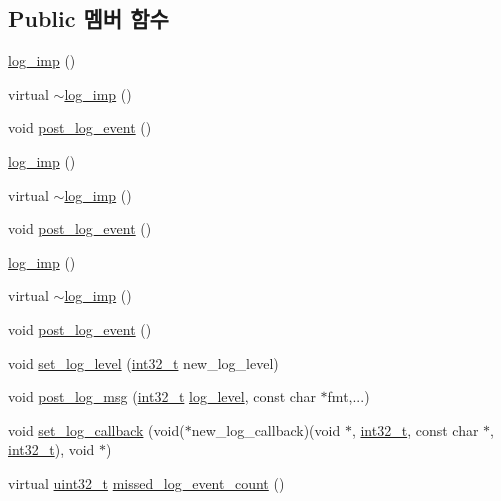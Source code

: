 \subsection*{Public 멤버 함수}
\begin{DoxyCompactItemize}
\item 
\hyperlink{classavdecc__lib_1_1log__imp_a358a5cd1a26450e1ac58570629a96b3f}{log\+\_\+imp} ()
\item 
virtual \hyperlink{classavdecc__lib_1_1log__imp_a8c97e7d6cdd1a329d409636e3e667d78}{$\sim$log\+\_\+imp} ()
\item 
void \hyperlink{classavdecc__lib_1_1log__imp_a137dc3c4fd534258728955776b9d3eb9}{post\+\_\+log\+\_\+event} ()
\item 
\hyperlink{classavdecc__lib_1_1log__imp_a358a5cd1a26450e1ac58570629a96b3f}{log\+\_\+imp} ()
\item 
virtual \hyperlink{classavdecc__lib_1_1log__imp_a535441f391ad2bce5be869024c504aa0}{$\sim$log\+\_\+imp} ()
\item 
void \hyperlink{classavdecc__lib_1_1log__imp_a137dc3c4fd534258728955776b9d3eb9}{post\+\_\+log\+\_\+event} ()
\item 
\hyperlink{classavdecc__lib_1_1log__imp_a358a5cd1a26450e1ac58570629a96b3f}{log\+\_\+imp} ()
\item 
virtual \hyperlink{classavdecc__lib_1_1log__imp_a535441f391ad2bce5be869024c504aa0}{$\sim$log\+\_\+imp} ()
\item 
void \hyperlink{classavdecc__lib_1_1log__imp_a137dc3c4fd534258728955776b9d3eb9}{post\+\_\+log\+\_\+event} ()
\item 
void \hyperlink{classavdecc__lib_1_1log_ad2416d14295c0883c8b0f13cf36fe1db}{set\+\_\+log\+\_\+level} (\hyperlink{parse_8c_a37994e3b11c72957c6f454c6ec96d43d}{int32\+\_\+t} new\+\_\+log\+\_\+level)
\item 
void \hyperlink{classavdecc__lib_1_1log_a68139a6297697e4ccebf36ccfd02e44a}{post\+\_\+log\+\_\+msg} (\hyperlink{parse_8c_a37994e3b11c72957c6f454c6ec96d43d}{int32\+\_\+t} \hyperlink{classavdecc__lib_1_1log_aa07e39131a3e0ab9ffd691b0f455134d}{log\+\_\+level}, const char $\ast$fmt,...)
\item 
void \hyperlink{classavdecc__lib_1_1log_aef98fd4c6cbf5e3b68b83380d43a9cd3}{set\+\_\+log\+\_\+callback} (void($\ast$new\+\_\+log\+\_\+callback)(void $\ast$, \hyperlink{parse_8c_a37994e3b11c72957c6f454c6ec96d43d}{int32\+\_\+t}, const char $\ast$, \hyperlink{parse_8c_a37994e3b11c72957c6f454c6ec96d43d}{int32\+\_\+t}), void $\ast$)
\item 
virtual \hyperlink{parse_8c_a6eb1e68cc391dd753bc8ce896dbb8315}{uint32\+\_\+t} \hyperlink{classavdecc__lib_1_1log_a5410f956bf04b4ce1376739f73667014}{missed\+\_\+log\+\_\+event\+\_\+count} ()
\end{DoxyCompactItemize}
